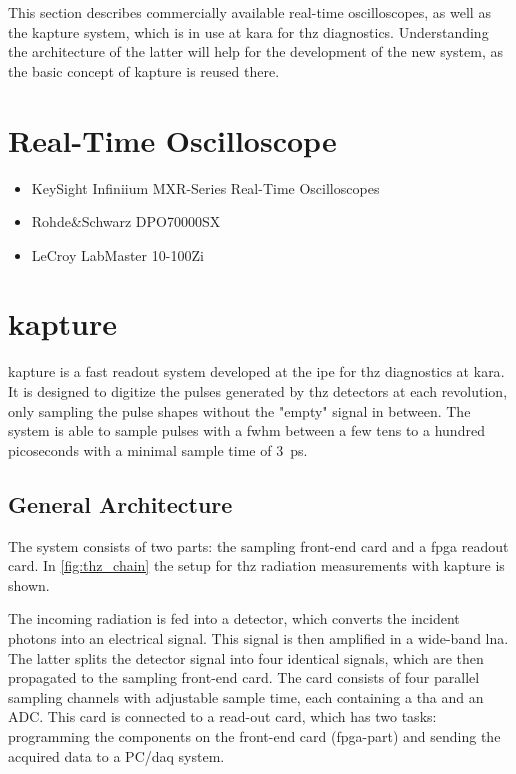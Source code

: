 This section describes commercially available real-time oscilloscopes, as well as the \gls{kapture} system, which is in use at \gls{kara} for \gls{thz} diagnostics. Understanding the architecture of the latter will help for the development of the new system, as the basic concept of \gls{kapture} is reused there.
\section{Real-Time Oscilloscope}
\begin{itemize}
	\item KeySight Infiniium MXR-Series Real-Time Oscilloscopes
	\item Rohde\&Schwarz DPO70000SX
	\item LeCroy LabMaster 10-100Zi
\end{itemize}

\section{\gls{kapture}}
\Gls{kapture} is a fast readout system developed at the \Gls{ipe} for \Gls{thz} diagnostics at \gls{kara}. It is designed to digitize the pulses generated by \Gls{thz} detectors at each revolution, only sampling the pulse shapes without the "empty" signal in between. The system is able to sample pulses with a \gls{fwhm} between a few tens to a hundred picoseconds with a minimal sample time of \SI{3}{\pico \second}. \cite{caselleKAP}

\subsection{General Architecture}
The system consists of two parts: the sampling front-end card and a \gls{fpga} readout card. In \autoref{fig:thz_chain} the setup for \gls{thz} radiation measurements with \gls{kapture} is shown. 

The incoming radiation is fed into a detector, which converts the incident photons into an electrical signal. This signal is then amplified in a wide-band \gls{lna}. The latter splits the detector signal into four identical signals, which are then propagated to the sampling front-end card. The card consists of four parallel sampling channels with adjustable sample time, each containing a \gls{tha} and an ADC. This card is connected to a read-out card, which has two tasks: programming the components on the front-end card (\gls{fpga}-part) and sending the acquired data to a PC/\gls{daq} system. \cite{caselle2014}

